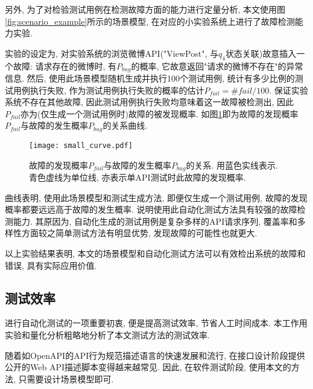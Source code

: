             另外, 为了对检验测试用例在检测故障方面的能力进行定量分析, 本文使用图\ref{fig:scenario_example}所示的场景模型, 在对应的小实验系统上进行了故障检测能力实验.
            
            实验的设定为, 对实验系统的浏览微博API("ViewPost", 与$q_4$状态关联)故意插入一个故障: 请求存在的微博时, 有$P_{bug}$的概率, 它故意返回"请求的微博不存在"的异常信息. 然后, 使用此场景模型随机生成并执行100个测试用例, 统计有多少比例的测试用例执行失败, 作为测试用例执行失败的概率的估计$P_{fail} = \# fail / 100$. 保证实验系统不存在其他故障, 因此测试用例执行失败均意味着这一故障被检测出, 因此$P_{fail}$亦为(仅生成一个测试用例时)故障的被发现概率. 如图\ref{fig:pbug_pfail_graph}即为故障的发现概率$P_{fail}$与故障的发生概率$P_{bug}$的关系曲线.
            \begin{figure}[!htb]
                \centering
                \texttt{[image: small\_curve.pdf]}
                \caption{故障的发现概率$P_{fail}$与故障的发生概率$P_{bug}$的关系. 用蓝色实线表示. 青色虚线为单位线, 亦表示单API测试时此故障的发现概率.}
                \label{fig:pbug_pfail_graph}
            \end{figure}
            曲线表明, 使用此场景模型和测试生成方法, 即便仅生成一个测试用例, 故障的发现概率都要远远高于故障的发生概率. 说明使用此自动化测试方法具有较强的故障检测能力. 其原因为, 自动化生成的测试用例是复杂多样的API请求序列, 覆盖率和多样性方面较之简单测试方法有明显优势, 发现故障的可能性也就更大.
            
            以上实验结果表明, 本文的场景模型和自动化测试方法可以有效检出系统的故障和错误, 具有实际应用价值.
    
        \subsection{测试效率}
    
            进行自动化测试的一项重要初衷, 便是提高测试效率, 节省人工时间成本. 本工作用实验和量化分析粗略地分析了本文测试方法的测试效率.
            
            随着如OpenAPI的API行为规范描述语言的快速发展和流行, 在接口设计阶段提供公开的Web API描述脚本变得越来越常见. 因此, 在软件测试阶段, 使用本文的方法, 只需要设计场景模型即可.
            
